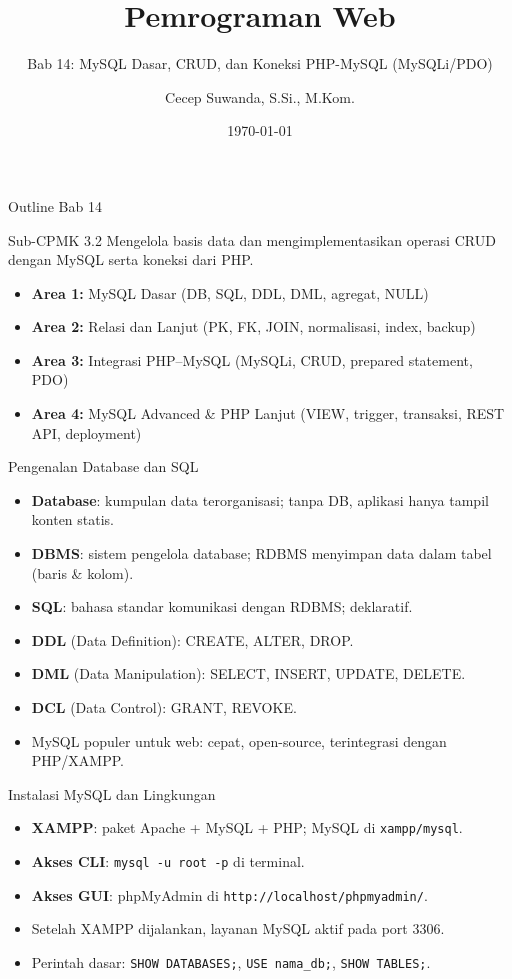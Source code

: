 \documentclass[handout]{beamer}
\title[Bab 14 -- MySQL]{Pemrograman Web}
\subtitle{Bab 14: MySQL Dasar, CRUD, dan Koneksi PHP-MySQL (MySQLi/PDO)}
\author{Cecep Suwanda, S.Si., M.Kom.}
\institute{Universitas Bale Bandung}
\date{\today}
\begin{document}
\begin{frame}
	\titlepage
\end{frame}

\begin{frame}[shrink=15]{Outline Bab 14}
	\begin{block}{Sub-CPMK 3.2}
		Mengelola basis data dan mengimplementasikan operasi CRUD dengan MySQL serta koneksi dari PHP.
	\end{block}
	\begin{itemize}
		\item \textbf{Area 1:} MySQL Dasar (DB, SQL, DDL, DML, agregat, NULL)
		\item \textbf{Area 2:} Relasi dan Lanjut (PK, FK, JOIN, normalisasi, index, backup)
		\item \textbf{Area 3:} Integrasi PHP--MySQL (MySQLi, CRUD, prepared statement, PDO)
		\item \textbf{Area 4:} MySQL Advanced \& PHP Lanjut (VIEW, trigger, transaksi, REST API, deployment)
	\end{itemize}
\end{frame}

\begin{frame}{Pengenalan Database dan SQL}
	\begin{itemize}
		\item \textbf{Database}: kumpulan data terorganisasi; tanpa DB, aplikasi hanya tampil konten statis.
		\item \textbf{DBMS}: sistem pengelola database; RDBMS menyimpan data dalam tabel (baris \& kolom).
		\item \textbf{SQL}: bahasa standar komunikasi dengan RDBMS; deklaratif.
		\item \textbf{DDL} (Data Definition): CREATE, ALTER, DROP.
		\item \textbf{DML} (Data Manipulation): SELECT, INSERT, UPDATE, DELETE.
		\item \textbf{DCL} (Data Control): GRANT, REVOKE.
		\item MySQL populer untuk web: cepat, open-source, terintegrasi dengan PHP/XAMPP.
	\end{itemize}
\end{frame}

\begin{frame}{Instalasi MySQL dan Lingkungan}
	\begin{itemize}
		\item \textbf{XAMPP}: paket Apache + MySQL + PHP; MySQL di \texttt{xampp/mysql}.
		\item \textbf{Akses CLI}: \texttt{mysql -u root -p} di terminal.
		\item \textbf{Akses GUI}: phpMyAdmin di \texttt{http://localhost/phpmyadmin/}.
		\item Setelah XAMPP dijalankan, layanan MySQL aktif pada port 3306.
		\item Perintah dasar: \texttt{SHOW DATABASES;}, \texttt{USE nama\_db;}, \texttt{SHOW TABLES;}.
	\end{itemize}
\end{frame}
\end{document}
